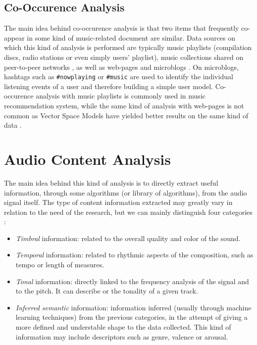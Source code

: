 \subsection{Co-Occurence Analysis}
The main idea behind co-occurence analysis is that two items that frequently co-appear in some kind of music-related document are similar. Data sources on which this kind of analysis is performed are typically music playlists \cite{pachet01} (compilation discs, radio stations or even simply users' playlist), music collections shared on peer-to-peer networks \cite{whitman02}, as well as web-pages \cite{zadel04} \cite{cohen00} and microblogs \cite{schedlmicro} \cite{zangerle12}. On microblogs, hashtags such as \texttt{#nowplaying} or \texttt{#music} are used to identify the individual listening events of a user and therefore building a simple user model. Co-occurence analysis with music playlists is commonly used in music recommendation system, while the same kind of analysis with web-pages is not common as Vector Space Models have yielded better results on the same kind of data \cite{schedlpohle}.

\section{Audio Content Analysis}
The main idea behind this kind of analysis is to directly extract useful information, through some algorithms (or library of algorithms), from the audio signal itself. The type of content information extracted may greatly vary in relation to the need of the research, but we can mainly distinguish four categories \cite{bogdanov13}:
\begin{itemize}
\item \textit{Timbral} information: related to the overall quality and color of the sound.
\item \textit{Temporal} information: related to rhythmic aspects of the composition, such as tempo or length of measures.
\item \textit{Tonal} information: directly linked to the frequency analysis of the signal and to the pitch. It can describe  or the tonality of a given track.
\item \textit{Inferred semantic} information: information inferred (usually through machine learning techniques) from the previous categories, in the attempt of giving a more defined and understable shape to the data collected. This kind of information may include descriptors such as genre, valence or arousal.
\end{itemize}


